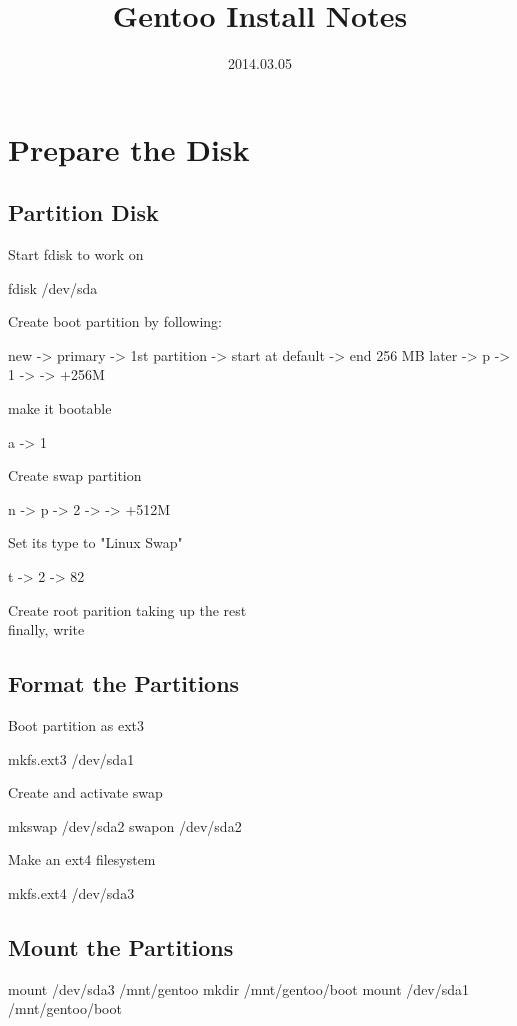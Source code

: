 
\title{Gentoo Install Notes}
\date{2014.03.05}



\tableofcontents

\section{Prepare the Disk}

\subsection{Partition Disk}

Start fdisk to work on 
\begin{code}
fdisk /dev/sda
\end{code}

Create boot partition by following:
\begin{code}
new -> primary -> 1st partition 
  -> start at default ->  end 256 MB later
  -> p -> 1 -> -> +256M
\end{code}
make it bootable
\begin{code}
a -> 1
\end{code}

Create swap partition
\begin{code}
n -> p -> 2 -> -> +512M
\end{code}
Set its type to "Linux Swap"
\begin{code}
t -> 2 -> 82
\end{code}

Create root parition taking up the rest
\\finally, write

\subsection{Format the Partitions}

Boot partition as ext3
\begin{code}
mkfs.ext3 /dev/sda1
\end{code}
Create and activate swap
\begin{code}
mkswap /dev/sda2
swapon /dev/sda2
\end{code}
Make  an ext4 filesystem
\begin{code}
mkfs.ext4 /dev/sda3
\end{code}

\subsection{Mount the Partitions}
\begin{code}
mount /dev/sda3 /mnt/gentoo
mkdir /mnt/gentoo/boot
mount /dev/sda1 /mnt/gentoo/boot
\end{code}

